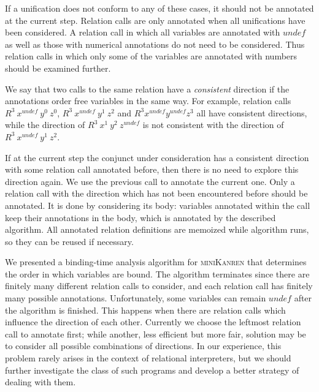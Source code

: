 \documentclass[submission,copyright,creativecommons]{eptcs}
\newcommand{\miniKanren}{\textsc{miniKanren}}
\newcommand\undef{unde\!f}
\begin{document}
If a unification does not conform to any of these cases, it should not be annotated at the current step.
Relation calls are only annotated when all unifications have been considered.
A relation call in which all variables are annotated with $\undef{}$ as well as those with numerical annotations do not need to be considered.
Thus relation calls in which only some of the variables are annotated with numbers should be examined further.

We say that two calls to the same relation have a \emph{consistent} direction if the annotations order free variables in the same way.
For example, relation calls $R^3 \ x^{\undef{}} \ y^{0} \ z^{0}$, $R^3 \ x^{\undef{}} \ y^{1} \ z^{2}$ and $R^3 x^{\undef{}} y^{\undef{}} z^{3}$ all have consistent directions, while the direction of $R^3 \ x^{1} \ y^{2} \ z^{\undef{}}$ is not consistent with the direction of $R^3 \ x^{\undef{}} \ y^{1} \ z^{2}$.

If at the current step the conjunct under consideration has a consistent direction with some relation call annotated before, then there is no need to explore this direction again.
We use the previous call to annotate the current one.
Only a relation call with the direction which has not been encountered before should be annotated.
It is done by considering its body: variables annotated within the call keep their annotations in the body, which is annotated by the described algorithm.
All annotated relation definitions are memoized while algorithm runs, so they can be reused if necessary.

We presented a binding-time analysis algorithm for \miniKanren{} that determines the order in which variables are bound.
The algorithm terminates since there are finitely many different relation calls to consider, and each relation call has finitely many possible annotations.
Unfortunately, some variables can remain $\undef{}$ after the algorithm is finished.
This happens when there are relation calls which influence the direction of each other.
Currently we choose the leftmost relation call to annotate first; while another, less efficient but more fair, solution may be to consider all possible combinations of directions.
In our experience, this problem rarely arises in the context of relational interpreters, but we should further investigate the class of such programs and develop a better strategy of dealing with them.



\nocite{*}


\end{document}
